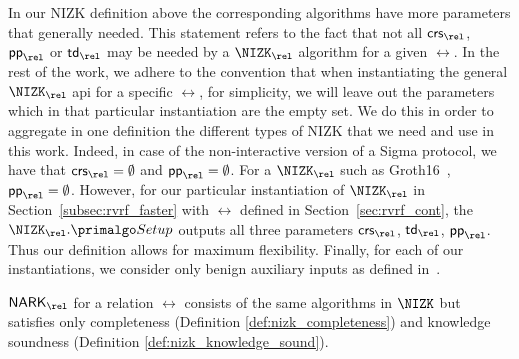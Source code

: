 \noindent In our NIZK definition above the corresponding algorithms have more parameters that generally needed. 
This statement refers to the fact that not all $\crs_\rel$, $\pp_\rel$ or $\tw_\rel$ may be needed by a $\NIZK_\rel$ algorithm for a given $\rel$. 
In the rest of the work, we adhere to the convention that when instantiating the general $\NIZK_\rel$ api for a specific $\rel$, for simplicity, 
we will leave out the parameters which in that particular instantiation are the empty set. We do this in order to aggregate in one definition 
the different types of NIZK that we need and use in this work. Indeed, in case of the non-interactive version of a Sigma protocol, we have 
that $\crs_\rel = \emptyset$ and $\pp_\rel = \emptyset$. For a $\NIZK_\rel$ such as Groth16~\cite{Groth16}, $\pp_\rel  = \emptyset$. 
However, for our particular instantiation of $\NIZK_\rel$ in Section~\ref{subsec:rvrf_faster} with $\rel$ defined in Section~\ref{sec:rvrf_cont}, the $\NIZK_\rel.\Setup$ outputs 
all three parameters $\crs_\rel$, $\tw_\rel$, $\pp_\rel$. Thus our definition allows for maximum flexibility. Finally, for each of our instantiations, we consider only benign 
auxiliary inputs as defined in~\cite{bening_auxiliary}. 

\begin{definition} $ \NARK_\rel $ for a relation $ \rel $ consists of the same algorithms in $ \NIZK $ but satisfies only completeness (Definition \ref{def:nizk_completeness}) and knowledge soundness (Definition \ref{def:nizk_knowledge_sound}).
\end{definition}

%

